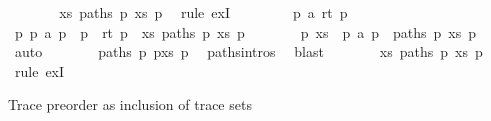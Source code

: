 \begin{isabellebody}
\ \ \ \ \isamarkupfalse%
\ \isamarkupfalse%
\ {\isachardoublequoteopen}{\isasymexists}xs{\isachardot}{\kern0pt}\ paths\ p\ xs\ p{\isachardoublequoteclose}\ \isamarkupfalse%
\ {\isacharparenleft}{\kern0pt}rule\ exI{\isacharparenright}{\kern0pt}\isanewline
\ \ \isamarkupfalse%
\isanewline
\ \ \ \ \isamarkupfalse%
\ p\ a\ rt\ p{\isacharprime}{\kern0pt}{\isacharprime}{\kern0pt}\isanewline
\ \ \ \ \isamarkupfalse%
\ {\isachardoublequoteopen}{\isasymexists}p{\isacharprime}{\kern0pt}{\isachardot}{\kern0pt}\ p\ {\isasymmapsto}a\ p{\isacharprime}{\kern0pt}\ {\isasymand}\ p{\isacharprime}{\kern0pt}\ {\isasymmapsto}{\isachardollar}{\kern0pt}\ rt\ p{\isacharprime}{\kern0pt}{\isacharprime}{\kern0pt}\ {\isasymand}\ {\isacharparenleft}{\kern0pt}{\isasymexists}xs{\isachardot}{\kern0pt}\ paths\ p{\isacharprime}{\kern0pt}\ xs\ p{\isacharprime}{\kern0pt}{\isacharprime}{\kern0pt}{\isacharparenright}{\kern0pt}{\isachardoublequoteclose}\isanewline
\ \ \ \ \isamarkupfalse%
\ \isamarkupfalse%
\ p{\isacharprime}{\kern0pt}\ xs\ \ {\isachardoublequoteopen}p\ {\isasymmapsto}a\ p{\isacharprime}{\kern0pt}{\isachardoublequoteclose}\ \ {\isachardoublequoteopen}paths\ p{\isacharprime}{\kern0pt}\ xs\ p{\isacharprime}{\kern0pt}{\isacharprime}{\kern0pt}{\isachardoublequoteclose}\ \isamarkupfalse%
\ auto\isanewline
\ \ \ \ \isamarkupfalse%
\ \isamarkupfalse%
\ {\isachardoublequoteopen}paths\ p\ {\isacharparenleft}{\kern0pt}p{\isacharprime}{\kern0pt}{\isacharhash}{\kern0pt}xs{\isacharparenright}{\kern0pt}\ p{\isacharprime}{\kern0pt}{\isacharprime}{\kern0pt}{\isachardoublequoteclose}\ \isamarkupfalse%
\ paths{\isachardot}{\kern0pt}intros{\isacharparenleft}{\kern0pt}{}{\isacharparenright}{\kern0pt}\ \isamarkupfalse%
\ blast\isanewline
\ \ \ \ \isamarkupfalse%
\ \isamarkupfalse%
\ {\isachardoublequoteopen}{\isasymexists}xs{\isachardot}{\kern0pt}\ paths\ p\ xs\ p{\isacharprime}{\kern0pt}{\isacharprime}{\kern0pt}{\isachardoublequoteclose}\ \isamarkupfalse%
\ {\isacharparenleft}{\kern0pt}rule\ exI{\isacharparenright}{\kern0pt}\isanewline
\ \ \isamarkupfalse%
\isanewline
{}\isamarkupfalse%
%
\endisatagproof
{\isafoldproof}%
%
\isadelimproof
%
\endisadelimproof
%
\begin{isamarkuptext}%
Trace preorder as inclusion of trace sets%

\end{isamarkuptext}
\end{isabellebody}
